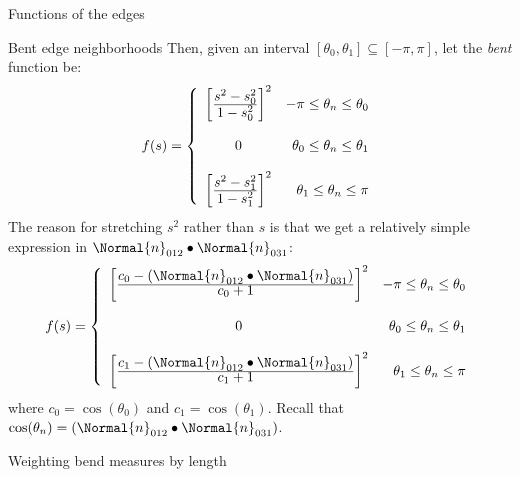 \begin{plSection}{Functions of the edges}
\begin{plSection}{Bent edge neighborhoods}
Then, 
given an interval $\left[ \theta_0, \theta_1 \right] \subseteq \left[ -\pi, \pi \right]$,
let the {\it bent} function be:
\begin{equation}
f(s)
= 
\left\{
\begin{array}{cr}
\left[ {  
\frac{\textstyle
s^2 - s_0^2}
{\textstyle
1 - s_0^2}
  } \right]^2 
& -\pi \leq \theta_n \leq \theta_0
\\
\\
0                            
& \theta_0 \leq \theta_n \leq \theta_1
\\
\\
\left[ {
  {\textstyle s^2 - s_1^2} 
  \over 
  {\textstyle 1 - s_1^2}
  } \right]^2  
& \theta_1 \leq \theta_n \leq \pi
\end{array}
\right.
\end{equation}
The reason for stretching $s^2$ rather than $s$
is that we get a relatively simple expression
in $\Normal{n}_{012} \bullet \Normal{n}_{031}$:
\begin{equation}
f(s)
= 
\left\{
\begin{array}{cr}
\left[ {
  {\textstyle c_0 - \left(\Normal{n}_{012} \bullet \Normal{n}_{031}\right) } 
  \over 
  {\textstyle c_0 + 1}
   } \right]^2
& -\pi \leq \theta_n \leq \theta_0
\\
\\
0                            
& \theta_0 \leq \theta_n \leq \theta_1
\\
\\
\left[ {\textstyle {c_1 - \left(\Normal{n}_{012} \bullet \Normal{n}_{031}\right)} 
    \over {\textstyle c_1 + 1}} \right]^2
& \theta_1 \leq \theta_n \leq \pi
\end{array}
\right.
\end{equation}
where $c_0 = \cos(\theta_0)$
and $c_1 = \cos(\theta_1)$.
Recall that $\cos(\theta_n) = \left(\Normal{n}_{012} \bullet \Normal{n}_{031}\right)$.

\end{plSection}%

\begin{plSection}{Weighting bend measures by length}
\label{sec:length_weighted_bend}


\end{plSection}
\end{plSection}
